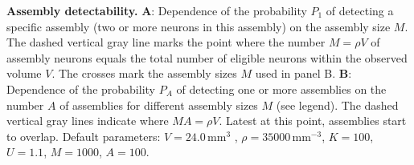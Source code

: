 
{\bf Assembly detectability.} 
{\bf A}: Dependence of the probability $P_1$ of detecting a specific assembly (two or more neurons
in this assembly) on the assembly size $M$.
The dashed vertical gray line marks the point where the number $M = \rho{}V$ of assembly neurons equals the total number of eligible neurons within the observed volume $V$.
The crosses mark the assembly sizes $M$ used in panel B.
{\bf B}: Dependence of the probability $P_A$ of detecting one or more assemblies on the number $A$ of assemblies for different assembly sizes $M$ (see legend).
The dashed vertical gray lines indicate where $MA = \rho{}V$. Latest at this point, assemblies start to overlap.
Default parameters: $V=24.0\,\text{mm}^3$ , $\rho=35000\,\text{mm}^{-3}$, $K=100$, $U=1.1$, $M=1000$, $A=100$.
    